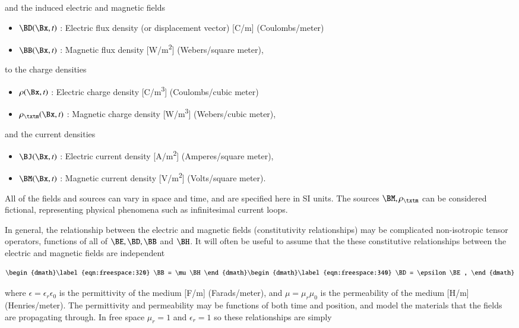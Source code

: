 and the induced electric and magnetic fields

\begin{itemize}
	\item \( \BD(\Bx, t) \) : Electric flux density (or displacement vector) [\si{C/m}] (Coulombs/meter)
	\item \( \BB(\Bx, t) \) : Magnetic flux density [\si{W/m^2}] (Webers/square meter),
\end{itemize}

to the charge densities

\begin{itemize}
	\item \( \rho(\Bx, t) \) : Electric charge density [\si{C/m^3}] (Coulombs/cubic meter)
   \item \( \rho_\txtm(\Bx, t) \) : Magnetic charge density [\si{W/m^3}] (Webers/cubic meter),
\end{itemize}

and the current densities

\begin{itemize}
	\item \( \BJ(\Bx, t) \) : Electric current density [\si{A/m^2}] (Amperes/square meter),
   \item \( \BM(\Bx, t) \) : Magnetic current density [\si{V/m^2}] (Volts/square meter).
\end{itemize}

All of the fields and sources can vary in space and time, and are specified here in SI units.
The sources \( \BM, \rho_\txtm \) can be considered fictional, representing physical phenomena such as infinitesimal current loops.

In general, the relationship between the electric and magnetic fields (constitutivity relationships) may be complicated
non-isotropic tensor operators, functions of all of \( \BE, \BD, \BB \) and \( \BH \).
It will often be useful to assume that the these constitutive relationships between the electric and magnetic fields are independent

\begin{subequations}
\label{eqn:freespace:300}
\begin{dmath}\label{eqn:freespace:320}
\BB = \mu \BH
\end{dmath}
\begin{dmath}\label{eqn:freespace:340}
\BD = \epsilon \BE,
\end{dmath}
\end{subequations}

where \( \epsilon = \epsilon_r \epsilon_0 \) is the permittivity of the medium [\si{F/m}] (Farads/meter), and \( \mu = \mu_r \mu_0 \) is the permeability of the medium [\si{H/m}] (Henries/meter).
The permittivity and permeability may be functions of both time and position, and model the materials that the fields are propagating through.
In free space \( \mu_r = 1 \) and \( \epsilon_r = 1\) so these relationships are simply


